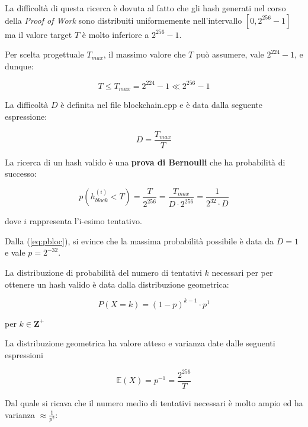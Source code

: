 \documentclass{article}
\begin{document}
La difficoltà di questa ricerca è dovuta al fatto che gli hash generati nel corso della \textit{Proof of Work} sono distribuiti uniformemente nell'intervallo $ \left [0, 2^{256} - 1 \right ]$ ma il valore target $T$ è molto inferiore a $2^{256} - 1$. 

Per scelta progettuale $T_{max}$, il massimo valore che $T$ può assumere, vale $2^{224} - 1$, e dunque:

\begin{equation}
    T \le T_{max} = 2^{224} - 1 \ll 2^{256} - 1 \label{target_value}
\end{equation}

La difficoltà $D$ è definita nel file blockchain.cpp e è data dalla seguente espressione:

\begin{equation}
    D = \frac{T_{max}}{T} \label{diff}
\end{equation}

La ricerca di un hash valido è una \textbf{prova di Bernoulli} che ha probabilità di successo:

\begin{equation}
    \label{eq:pbloc}
    p(h_{block}^{(i)} < T) = \frac{T}{2^{256}} =\frac{T_{max}}{D \cdot 2^{256}} = \frac{1}{2^{32} \cdot D}
\end{equation}

dove $i$ rappresenta l'i-esimo tentativo.

Dalla (\ref{eq:pbloc}), si evince che la massima probabilità possibile è data da $D = 1$ e vale $p = 2^{-32}$.

La distribuzione di probabilità del numero di tentativi $k$ necessari per per ottenere un hash valido è data dalla distribuzione geometrica:

\begin{equation}
    P(X = k) = (1 - p)^{k-1} \cdot p^{1} \label{distribuzione_geometrica}
\end{equation}

per $k \in \mathbf{Z}^{+}$

La distribuzione geometrica ha valore atteso e varianza date dalle seguenti espressioni

\begin{equation}
    \mathbb{E}(X) = p^{-1} = \frac{2^{256}}{T} \label{valore atteso}
\end{equation}

Dal quale si ricava che il numero medio di tentativi necessari è molto ampio ed ha varianza $\approx \frac{1}{p^{2}}$:
\end{document}
